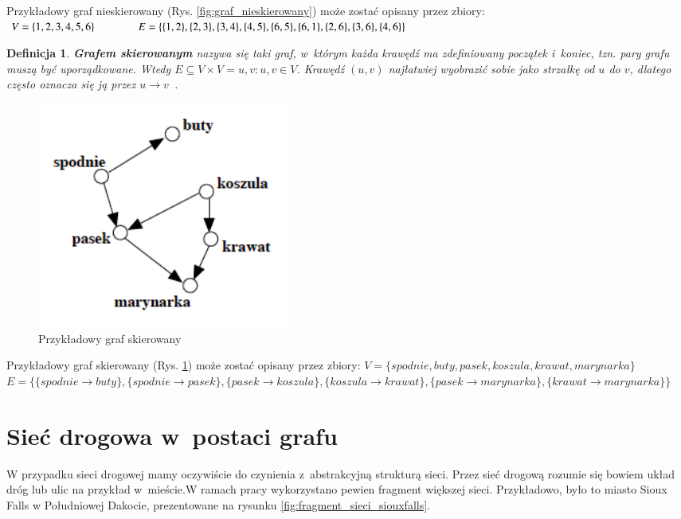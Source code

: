 \documentclass[twoside,12pt]{report}
\newtheorem{definition}{Definicja} %
\begin{document}
Przykładowy graf nieskierowany (Rys. \ref{fig:graf_nieskierowany}) może zostać opisany przez zbiory:
\begin{math}
V=\{1,2,3,4,5,6\} 
\hspace*{40px}
E=\{\{1,2\},\{2,3\},\{3,4\},\{4,5\},\{6,5\},\{6,1\},\{2,6\},\{3,6\},\{4,6\}\}
\end{math}

\begin{definition}\label{def:graf_skierowany}
\textbf{Grafem skierowanym} nazywa się taki graf, w~którym każda krawędź ma zdefiniowany początek i~koniec, tzn. pary grafu muszą być uporządkowane. Wtedy $E \subseteq V \times V = {{u,v}:u,v \in V}$.
Krawędź $(u,v)$ najłatwiej wyobrazić sobie jako strzałkę od $u$ do $v$, dlatego często oznacza się ją przez $u \rightarrow v$~\cite{grafy}.
\end{definition}

\begin{figure}[htbp]
\centering
\includegraphics[width=0.40\textwidth]{img/graf2}
\caption{Przykładowy graf skierowany} 
\label{fig:graf_skierowany} 
\end{figure}

Przykładowy graf skierowany (Rys. \ref{fig:graf_skierowany}) może zostać opisany przez zbiory:
\newline
\begin{math}
V=\{spodnie, buty, pasek, koszula, krawat, marynarka\}
\end{math}
\newline
\begin{math}
E=\{\{spodnie \rightarrow buty\},\{spodnie  \rightarrow pasek\},
	\{pasek \rightarrow koszula\},\{koszula \rightarrow krawat\},
	\{pasek \rightarrow marynarka\},\{krawat \rightarrow marynarka\}\}
\end{math}

\section{Sieć drogowa w~postaci grafu}
W przypadku sieci drogowej mamy oczywiście do czynienia z~abstrakcyjną strukturą sieci. Przez sieć drogową rozumie się bowiem układ dróg lub ulic na przykład w~mieście.W ramach pracy wykorzystano pewien fragment większej sieci. Przykładowo, było to miasto Sioux Falls w Południowej Dakocie, prezentowane na rysunku \ref{fig:fragment_sieci_siouxfalls}. 
\end{document}
